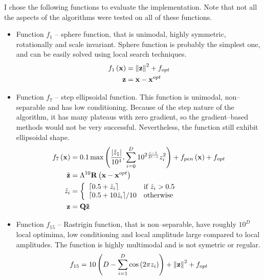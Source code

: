 I chose the following functions to evaluate the implementation. Note that not all the aspects of the algorithms were tested on all of these functions.
\begin{itemize}
    \item Function $f_1$ -- sphere function, that is unimodal, highly symmetric, rotationally and scale invariant. Sphere function is probably the simplest one, and can be easily solved using local search techniques.
    \begin{align*}
        f_{1}\left(\mathbf{x}\right) &= \left\lVert\mathbf{z}\right\rVert^2+f_{opt} \\
        \mathbf{z} &= \mathbf{x} - \mathbf{x}^{opt}
    \end{align*}
    \item Function $f_7$ -- step ellipsoidal function. This function is unimodal, non--separable and has low conditioning. Because of the step nature of the algorithm, it has many plateaus with zero gradient, so the gradient--based methods would not be very successful. Nevertheless, the function still exhibit ellipsoidal shape. 
    \begin{align*}
        f_{7}\left(\mathbf{x}\right) &= 0.1\max\left( \frac{\abs{\hat{z}_1}}{10^4}, \sum_{i=0}^D 10^{2\frac{i-1}{D-i}}z_i^2 \right) + f_{pen}\left( \mathbf{x} \right)+f_{opt} \\
        \hat{\mathbf{z}} &= \Lambda^{10}\mathbf{R} \left( \mathbf{x} - \mathbf{x}^{opt} \right) \\
        \tilde{z}_i &=\left\{ 
            \begin{array}{ll}
                \lceil 0.5 + \hat{z}_i \rceil       & \text{if}\ \hat{z}_i>0.5 \\
                \lceil 0.5 + 10\hat{z}_i\rceil / 10 & \text{otherwise}        \\
            \end{array}  
            \right. \\
        \mathbf{z} &= \mathbf{Q}\mathbf{\tilde{z}} 
    \end{align*}
    \item Function $f_{15}$ -- Rastrigin function, that is non--separable, have roughly $10^D$ local optimima, low conditioning and local amplitude large compared to local amplitudes. The function is highly multimodal and is not symetric or regular.
    \begin{align*}
        f_{15} &= 10\left( D-\sum_{i=1}^D \cos\left(2 \pi z_i\right) \right) + \norm{\mathbf{z}}^2+f_{opt} \\

\end{align*}
\end{itemize}
